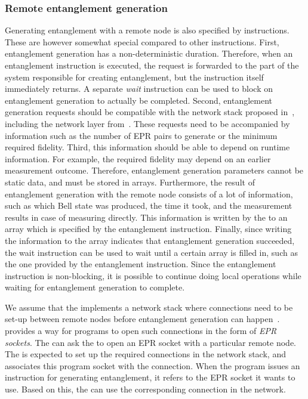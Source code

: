 \subsubsection{Remote entanglement generation}
Generating entanglement with a remote node is also specified by instructions.
These are however somewhat special compared to other instructions.
First, entanglement generation has a non-deterministic duration.
Therefore, when an entanglement instruction is executed, the request is forwarded to the part of the system responsible for creating entanglement, but the instruction itself immediately returns.
A separate \textit{wait} instruction can be used to block on entanglement generation to actually be completed.
Second, entanglement generation requests should be compatible with the network stack proposed in~\cite{dahlberg2019linklayer}, including the network layer from~\cite{kozlowski2020networklayer}.
These requests need to be accompanied by information such as the number of EPR pairs to generate or the minimum required fidelity.
Third, this information should be able to depend on runtime information.
For example, the required fidelity may depend on an earlier measurement outcome.
Therefore, entanglement generation parameters cannot be static data, and must be stored in arrays.
Furthermore, the result of entanglement generation with the remote node consists of a lot of information, such as which Bell state was produced, the time it took, and the measurement results in case of measuring directly.
This information is written by the \QNPU to an array which is specified by the entanglement instruction.
Finally, since writing the information to the array indicates that entanglement generation succeeded, the wait instruction can be used to wait until a certain array is filled in, such as the one provided by the entanglement instruction.
Since the entanglement instruction is non-blocking, it is possible to continue doing local operations while waiting for entanglement generation to complete.

We assume that the \QNPU implements a network stack where connections need to be set-up between remote nodes before entanglement generation can happen~\cite{kozlowski2020networklayer, dahlberg2019linklayer}.
\netqasm provides a way for programs to open such connections in the form of \textit{EPR sockets}.
The \host can ask the \QNPU to open an EPR socket with a particular remote node.
The \QNPU is expected to set up the required connections in the network stack, and associates this program socket with the connection.
When the program issues an instruction for generating entanglement, it refers to the EPR socket it wants to use.
Based on this, the \QNPU can use the corresponding connection in the network.


